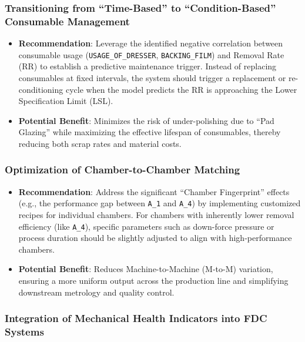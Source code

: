 \documentclass[11pt]{article}
\providecommand{\tightlist}{%
      \setlength{\itemsep}{0pt}\setlength{\parskip}{0pt}}
\begin{document}
\subsubsection{Transitioning from ``Time-Based'' to ``Condition-Based''
Consumable
Management}\label{transitioning-from-time-based-to-condition-based-consumable-management}

\begin{itemize}
\tightlist
\item
  \textbf{Recommendation}: Leverage the identified negative correlation
  between consumable usage (\texttt{USAGE\_OF\_DRESSER},
  \texttt{BACKING\_FILM}) and Removal Rate (RR) to establish a
  predictive maintenance trigger. Instead of replacing consumables at
  fixed intervals, the system should trigger a replacement or
  re-conditioning cycle when the model predicts the RR is approaching
  the Lower Specification Limit (LSL).
\item
  \textbf{Potential Benefit}: Minimizes the risk of under-polishing due
  to ``Pad Glazing'' while maximizing the effective lifespan of
  consumables, thereby reducing both scrap rates and material costs.
\end{itemize}

\subsubsection{Optimization of Chamber-to-Chamber
Matching}\label{optimization-of-chamber-to-chamber-matching}

\begin{itemize}
\tightlist
\item
  \textbf{Recommendation}: Address the significant ``Chamber
  Fingerprint'' effects (e.g., the performance gap between \texttt{A\_1}
  and \texttt{A\_4}) by implementing customized recipes for individual
  chambers. For chambers with inherently lower removal efficiency (like
  \texttt{A\_4}), specific parameters such as down-force pressure or
  process duration should be slightly adjusted to align with
  high-performance chambers.
\item
  \textbf{Potential Benefit}: Reduces Machine-to-Machine (M-to-M)
  variation, ensuring a more uniform output across the production line
  and simplifying downstream metrology and quality control.
\end{itemize}

\subsubsection{Integration of Mechanical Health Indicators into FDC
Systems}\label{integration-of-mechanical-health-indicators-into-fdc-systems}
\end{document}
